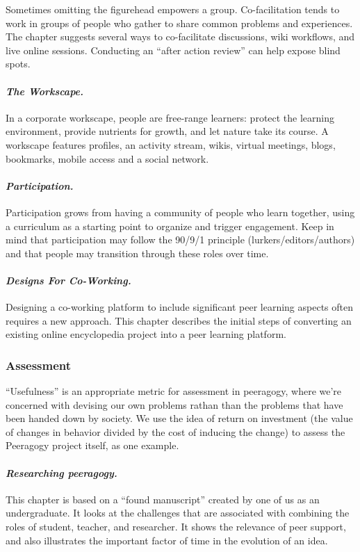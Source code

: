 \noindent Sometimes omitting the figurehead empowers a group.
Co-facilitation tends to work in groups of people who gather to share
common problems and experiences. The chapter suggests several ways to
co-facilitate discussions, wiki workflows, and live online sessions.
Conducting an ``after action review'' can help expose blind spots.

\paragraph{\emph{The Workscape.}} In a corporate workscape, people are free-range
learners: protect the learning environment, provide nutrients for
growth, and let nature take its course. A workscape features profiles,
an activity stream, wikis, virtual meetings, blogs, bookmarks, mobile
access and a social network.

\paragraph{\emph{Participation.}} Participation grows from having a
community of people who learn together, using a curriculum as a starting
point to organize and trigger engagement. Keep in mind that
participation may follow the 90/9/1 principle (lurkers/editors/authors)
and that people may transition through these roles over time.

\paragraph{\emph{Designs For Co-Working.}}
Designing a co-working platform to include significant peer learning
aspects often requires a new approach.  This chapter describes the
initial steps of converting an existing online encyclopedia project
into a peer learning platform.

\subsubsection{Assessment}

\noindent  ``Usefulness'' is an appropriate
metric for assessment in peeragogy, where we're concerned with
devising our own problems rathan than the problems that have been
handed down by society.  We use the idea of return on investment (the
value of changes in behavior divided by the cost of inducing the
change) to assess the Peeragogy project itself, as one example.

\paragraph{\emph{Researching peeragogy.}} This chapter is based on a ``found manuscript'' created by one of us as an undergraduate.  It looks at the
challenges that are associated with combining the roles of student,
teacher, and researcher.  It shows the relevance of peer support, and
also illustrates the important factor of time in the evolution of an
idea.

